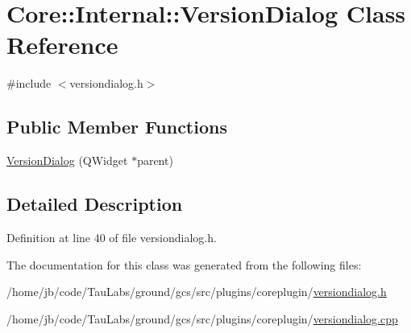 \hypertarget{class_core_1_1_internal_1_1_version_dialog}{\section{\-Core\-:\-:\-Internal\-:\-:\-Version\-Dialog \-Class \-Reference}
\label{class_core_1_1_internal_1_1_version_dialog}
}


{\ttfamily \#include $<$versiondialog.\-h$>$}

\subsection*{\-Public \-Member \-Functions}
\begin{DoxyCompactItemize}
\item 
\hyperlink{group___core_plugin_ga3a3324c5e62d8d766d8ef28592cb11fa}{\-Version\-Dialog} (\-Q\-Widget $\ast$parent)
\end{DoxyCompactItemize}


\subsection{\-Detailed \-Description}


\-Definition at line 40 of file versiondialog.\-h.



\-The documentation for this class was generated from the following files\-:\begin{DoxyCompactItemize}
\item 
/home/jb/code/\-Tau\-Labs/ground/gcs/src/plugins/coreplugin/\hyperlink{versiondialog_8h}{versiondialog.\-h}\item 
/home/jb/code/\-Tau\-Labs/ground/gcs/src/plugins/coreplugin/\hyperlink{versiondialog_8cpp}{versiondialog.\-cpp}\end{DoxyCompactItemize}

